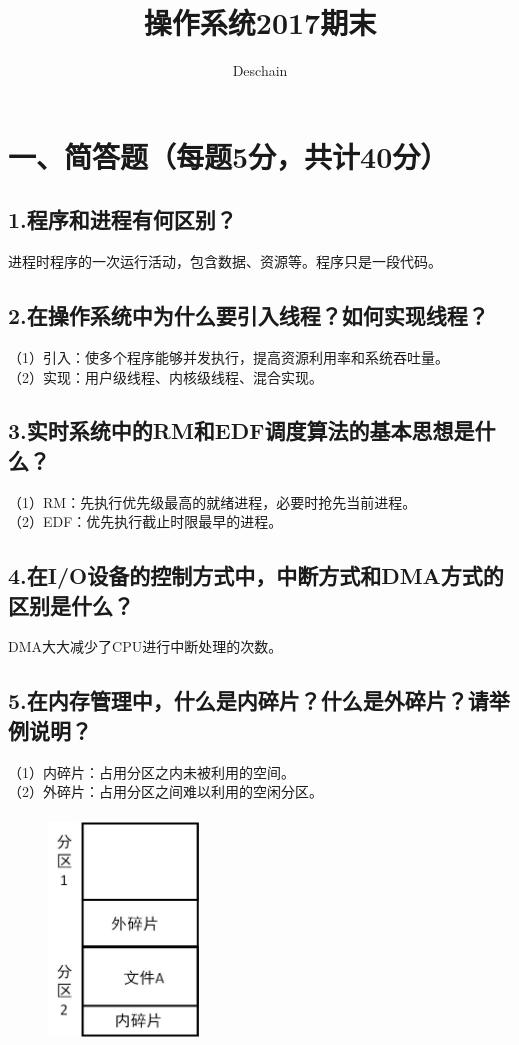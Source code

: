 \documentclass[UTF8]{ctexart}
\title{操作系统2017期末}
\author{Deschain}
\begin{document}
\maketitle
\section*{一、简答题（每题5分，共计40分）}
\subsection*{1.程序和进程有何区别？}
进程时程序的一次运行活动，包含数据、资源等。程序只是一段代码。\\
\subsection*{2.在操作系统中为什么要引入线程？如何实现线程？}
（1）引入：使多个程序能够并发执行，提高资源利用率和系统吞吐量。\\
（2）实现：用户级线程、内核级线程、混合实现。\\
\subsection*{3.实时系统中的RM和EDF调度算法的基本思想是什么？}
（1）RM：先执行优先级最高的就绪进程，必要时抢先当前进程。\\
（2）EDF：优先执行截止时限最早的进程。\\
\subsection*{4.在I/O设备的控制方式中，中断方式和DMA方式的区别是什么？}
DMA大大减少了CPU进行中断处理的次数。
\subsection*{5.在内存管理中，什么是内碎片？什么是外碎片？请举例说明？}
（1）内碎片：占用分区之内未被利用的空间。\\
（2）外碎片：占用分区之间难以利用的空闲分区。\\
\begin{figure}[H]                                         
    \centering                                                
    \includegraphics[width=4cm,height=6cm]{ans-1-5.jpg}        
    \caption*{}                                                                                   
\end{figure}
\end{document}
